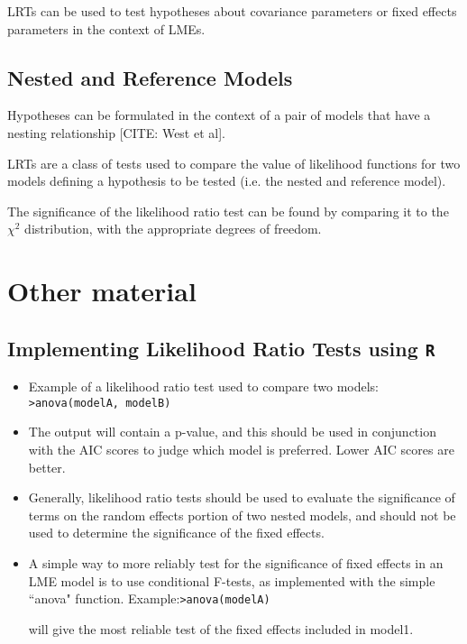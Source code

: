 \documentclass[12pt, a4paper]{article}
\begin{document}
LRTs can be used to test hypotheses about covariance parameters or fixed effects parameters in the context of LMEs.










\subsection{Nested and Reference Models}
Hypotheses can be formulated in the context of a pair of models that have a nesting relationship [CITE: West et al].

LRTs are a class of tests used to compare the value of likelihood functions for two models defining a hypothesis to be tested (i.e. the nested and reference model).

The significance of the likelihood ratio test can be found by comparing it to the  $\chi^2$ distribution, with the appropriate degrees of freedom.



\section{Other material}
\subsection{Implementing Likelihood Ratio Tests using \texttt{R}}
\begin{itemize}
	\item Example of a likelihood ratio test used to compare two models: \newline \texttt{>anova(modelA, modelB)}
	
	\item The output will contain a p-value, and this should be used in conjunction with the AIC scores to judge which model is preferred. Lower AIC scores are better.
	
	\item Generally, likelihood ratio tests should be used to evaluate the significance of terms on the
	random effects portion of two nested models, and should not be used to determine the significance of the fixed effects.
	\item A simple way to more reliably test for the significance of fixed effects in an LME model is to use
	conditional F-tests, as implemented with the simple ``anova" function.
	Example:\newline \texttt{>anova(modelA)}
	
	
	will give the most reliable test of the fixed effects included in model1.
\end{itemize}
\end{document}
